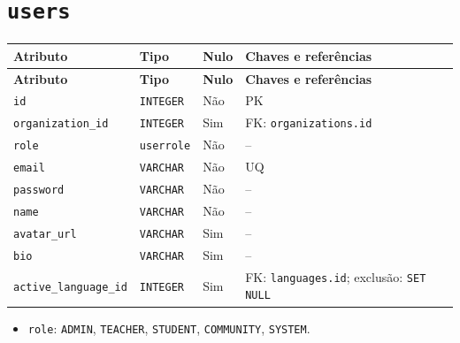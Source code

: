 \section*{\texttt{users}}
\begingroup\footnotesize
\setlength{\tabcolsep}{4pt}\renewcommand{\arraystretch}{1.15}
\begin{longtable}{|>{\raggedright\arraybackslash}p{}|>{\raggedright\arraybackslash}p{}|>{\raggedright\arraybackslash}p{}|>{\raggedright\arraybackslash}p{}|}
\hline
\textbf{Atributo} & \textbf{Tipo} & \textbf{Nulo} & \textbf{Chaves e referências} \\ \hline
\endfirsthead
\hline \textbf{Atributo} & \textbf{Tipo} & \textbf{Nulo} & \textbf{Chaves e referências} \\ \hline
\endhead
\texttt{id} & \texttt{INTEGER} & Não & PK \\ \hline
\texttt{organization\_\allowbreak{}id} & \texttt{INTEGER} & Sim & FK: \texttt{organizations.id} \\ \hline
\texttt{role} & \texttt{userrole} & Não & -- \\ \hline
\texttt{email} & \texttt{VARCHAR} & Não & UQ \\ \hline
\texttt{password} & \texttt{VARCHAR} & Não & -- \\ \hline
\texttt{name} & \texttt{VARCHAR} & Não & -- \\ \hline
\texttt{avatar\_\allowbreak{}url} & \texttt{VARCHAR} & Sim & -- \\ \hline
\texttt{bio} & \texttt{VARCHAR} & Sim & -- \\ \hline
\texttt{active\_\allowbreak{}language\_\allowbreak{}id} & \texttt{INTEGER} & Sim & FK: \texttt{languages.id}; exclusão: \texttt{SET NULL} \\ \hline
\end{longtable}
\begin{itemize}
\item \texttt{role}: \texttt{ADMIN}, \texttt{TEACHER}, \texttt{STUDENT}, \texttt{COMMUNITY}, \texttt{SYSTEM}.
\end{itemize}
\endgroup
